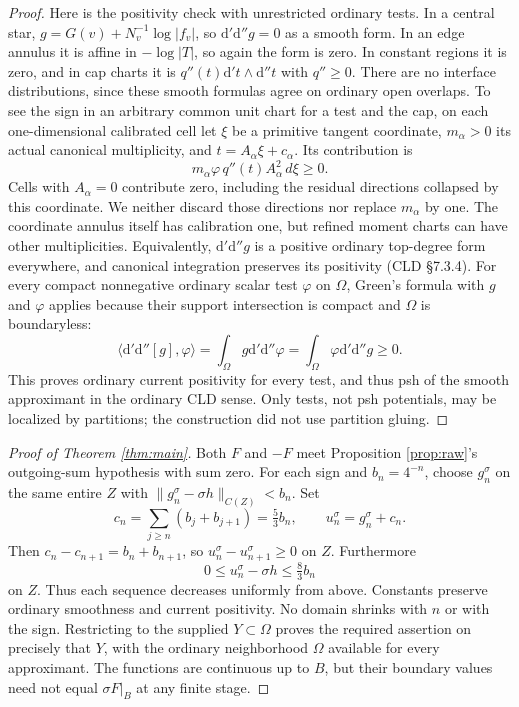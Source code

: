 \documentclass[11pt]{article}
\newcommand{\ddc}{\mathrm{d}'\mathrm{d}''}
\begin{document}
\begin{proof}
Here is the positivity check with unrestricted ordinary tests.
In a central star, $g=G(v)+N_v^{-1}\log|f_v|$, so
$\ddc g=0$ as a smooth form. In an edge annulus it is affine
in $-\log|T|$, so again the form is zero. In constant regions
it is zero, and in cap charts it is
$q''(t)\mathrm{d}'t\wedge\mathrm{d}''t$ with $q''\geq0$.
There are no interface distributions, since these smooth
formulas agree on ordinary open overlaps. To see the sign
in an arbitrary common unit chart for a test and the cap,
on each one-dimensional calibrated cell let $\xi$ be a
primitive tangent coordinate, $m_\alpha>0$ its actual
canonical multiplicity, and $t=A_\alpha\xi+c_\alpha$.
Its contribution is
\[
            m_\alpha\varphi\,q''(t)A_\alpha^2\,d\xi\geq0.
\]
Cells with $A_\alpha=0$ contribute zero, including the
residual directions collapsed by this coordinate. We neither
discard those directions nor replace $m_\alpha$ by one.
The coordinate annulus itself has calibration one, but
refined moment charts can have other multiplicities.
Equivalently, $\ddc g$ is a positive ordinary top-degree
form everywhere, and canonical integration preserves its
positivity (CLD \S7.3.4). For every compact nonnegative
ordinary scalar test $\varphi$ on $\Omega$, Green's formula
with $g$ and $\varphi$ applies because their support
intersection is compact and $\Omega$ is boundaryless:
\[
        \langle\ddc[g],\varphi\rangle
        =\int_\Omega g\ddc\varphi
        =\int_\Omega\varphi\ddc g\geq0.
\]
This proves ordinary current positivity for every test, and
thus psh of the smooth approximant in the ordinary CLD
sense. Only tests, not psh potentials, may be localized by
partitions; the construction did not use partition gluing.
\end{proof}

\begin{proof}[Proof of Theorem \ref{thm:main}]
Both $F$ and $-F$ meet Proposition \ref{prop:raw}'s outgoing-sum
hypothesis with sum zero. For each sign and $b_n=4^{-n}$,
choose $g_n^\sigma$ on the same entire $Z$ with
$\|g_n^\sigma-\sigma h\|_{C(Z)}<b_n$.
Set
\[
 c_n=\sum_{j\geq n}(b_j+b_{j+1})=\tfrac53 b_n,
 \qquad u_n^\sigma=g_n^\sigma+c_n.
\]
Then $c_n-c_{n+1}=b_n+b_{n+1}$, so
$u_n^\sigma-u_{n+1}^\sigma\geq0$ on $Z$.
Furthermore
\[
             0\leq u_n^\sigma-\sigma h\leq\tfrac83 b_n
\]
on $Z$. Thus each sequence decreases uniformly from above.
Constants preserve ordinary smoothness and current positivity.
No domain shrinks with $n$ or with the sign. Restricting to
the supplied $Y\subset\Omega$ proves the required assertion
on precisely that $Y$, with the ordinary neighborhood
$\Omega$ available for every approximant. The functions are
continuous up to $B$, but their boundary values need not
equal $\sigma F|_B$ at any finite stage.
\end{proof}
\end{document}

